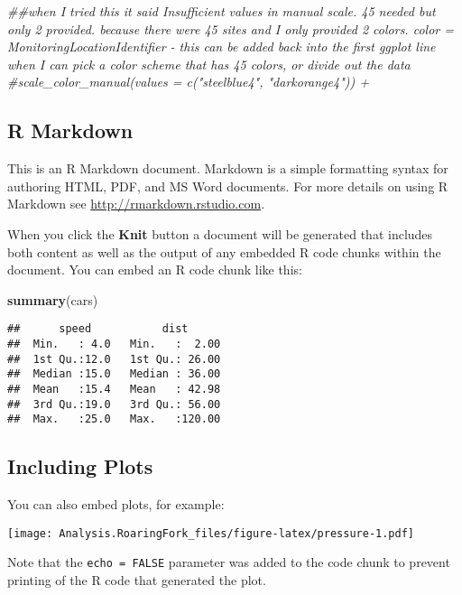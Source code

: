\documentclass[]{article}
\newenvironment{Shaded}{\begin{snugshade}}{\end{snugshade}}
\newcommand{\CommentTok}[1]{\textcolor[rgb]{0.56,0.35,0.01}{\textit{#1}}}
\newcommand{\KeywordTok}[1]{\textcolor[rgb]{0.13,0.29,0.53}{\textbf{#1}}}
\newcommand{\NormalTok}[1]{#1}
\begin{document}
\begin{Shaded}
\begin{Highlighting}[]
\CommentTok{##when I tried this it said Insufficient values in manual scale. 45 needed but only 2 provided. because there were 45 sites and I only provided 2 colors. color = MonitoringLocationIdentifier - this can be added back into the first ggplot line when I can pick a color scheme that has 45 colors, or divide out the data }
  \CommentTok{#scale_color_manual(values = c("steelblue4", "darkorange4")) +}
\end{Highlighting}
\end{Shaded}

\hypertarget{r-markdown}{%
\subsection{R Markdown}\label{r-markdown}}

This is an R Markdown document. Markdown is a simple formatting syntax
for authoring HTML, PDF, and MS Word documents. For more details on
using R Markdown see \url{http://rmarkdown.rstudio.com}.

When you click the \textbf{Knit} button a document will be generated
that includes both content as well as the output of any embedded R code
chunks within the document. You can embed an R code chunk like this:

\begin{Shaded}
\begin{Highlighting}[]
\KeywordTok{summary}\NormalTok{(cars)}
\end{Highlighting}
\end{Shaded}

\begin{verbatim}
##      speed           dist       
##  Min.   : 4.0   Min.   :  2.00  
##  1st Qu.:12.0   1st Qu.: 26.00  
##  Median :15.0   Median : 36.00  
##  Mean   :15.4   Mean   : 42.98  
##  3rd Qu.:19.0   3rd Qu.: 56.00  
##  Max.   :25.0   Max.   :120.00
\end{verbatim}

\hypertarget{including-plots}{%
\subsection{Including Plots}\label{including-plots}}

You can also embed plots, for example:

\texttt{[image: Analysis.RoaringFork\_files/figure-latex/pressure-1.pdf]}

Note that the \texttt{echo\ =\ FALSE} parameter was added to the code
chunk to prevent printing of the R code that generated the plot.
\end{document}
